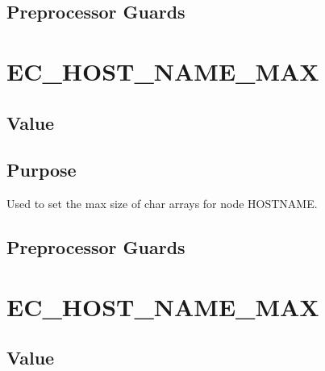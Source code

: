 \documentclass[letterpaper,10pt,english]{sphinxmanual}
\begin{document}
\subsection{Preprocessor Guards}
\label{\detokenize{definitions/definitions:id20}}
\sphinxAtStartPar
{}


\section{EC\_HOST\_NAME\_MAX}
\label{\detokenize{definitions/definitions:ec-host-name-max}}\label{\detokenize{definitions/definitions:id21}}

\subsection{Value}
\label{\detokenize{definitions/definitions:id22}}
\sphinxAtStartPar
{}


\subsection{Purpose}
\label{\detokenize{definitions/definitions:id23}}
\sphinxAtStartPar
Used to set the max size of char arrays for node HOSTNAME.


\subsection{Preprocessor Guards}
\label{\detokenize{definitions/definitions:id24}}
\sphinxAtStartPar
{}


\section{EC\_HOST\_NAME\_MAX}
\label{\detokenize{definitions/definitions:id25}}\label{\detokenize{definitions/definitions:id26}}

\subsection{Value}
\label{\detokenize{definitions/definitions:id27}}
\sphinxAtStartPar
{}
\end{document}
